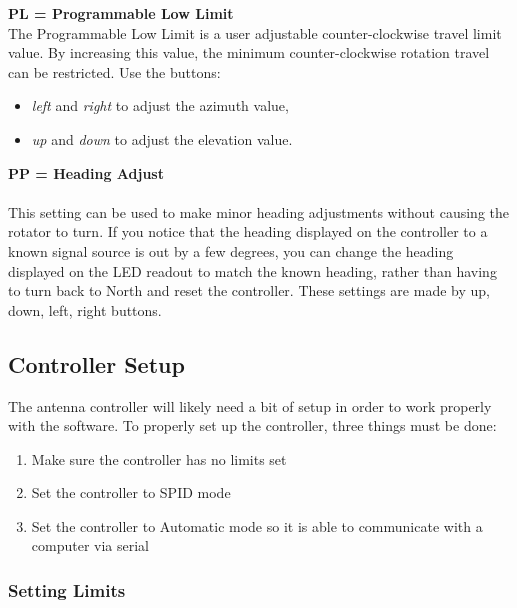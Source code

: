 \documentclass[11pt]{article} %
\begin{document}
\textbf{PL = Programmable Low Limit}
\\
The Programmable Low Limit is a user adjustable counter-clockwise travel limit value. By increasing this value, the minimum counter-clockwise rotation travel can be restricted. Use the buttons:
\begin{itemize}
\item \emph{left} and \emph{right} to adjust the azimuth value,
\item \emph{up} and \emph{down} to adjust the elevation value.
\end{itemize}
\textbf{PP = Heading Adjust}
\\ \\
This setting can be used to make minor heading adjustments without causing the rotator to turn. If you notice that the heading displayed on the controller to a known signal source is out by a few degrees, you can change the heading displayed on the LED readout to match the known heading, rather than having to turn back to North and reset the controller. These settings are made by up, down, left, right buttons.




\newpage
\subsection{Controller Setup}


The antenna controller will likely need a bit of setup in order to work properly with the software. To properly set up the controller, three things must be done: 

\begin{enumerate}
\item Make sure the controller has no limits set
\item Set the controller to SPID mode
\item Set the controller to Automatic mode so it is able to communicate with a computer via serial
\end{enumerate}

\subsubsection{Setting Limits}
\end{document}

